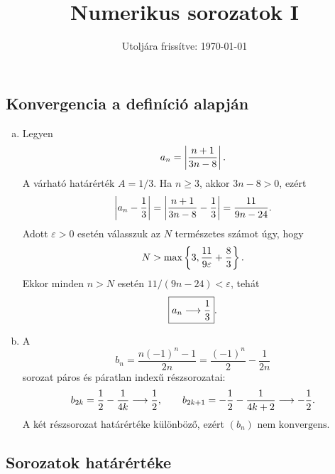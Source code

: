 \documentclass{szb-solution}
\title{Numerikus sorozatok I}
\date{Utoljára frissítve: \today}
\begin{document}
\maketitle

\subsection{Konvergencia a definíció alapján}

\begin{enumerate}[a)]
  \item Legyen
        $$
          a_n=\left|\frac{n+1}{3n-8}\right|
          \text.
        $$
        A várható határérték $A=1/3$. Ha $n\geq3$, akkor $3n-8>0$, ezért
        $$
          \left|a_n-\frac13\right|
          =\left|\frac{n+1}{3n-8}-\frac13\right|
          =\frac{11}{9n-24}
          \text.
        $$
        Adott $\varepsilon>0$ esetén válasszuk az $N$ természetes számot úgy,
        hogy
        $$
          N>\max\left\{3,\frac{11}{9\varepsilon}+\frac83\right\}
          \text.
        $$
        Ekkor minden $n>N$ esetén
        $11/(9n-24)<\varepsilon$, tehát
        $$
          \boxed{a_n\longrightarrow\frac13}
          \text.
        $$

  \item A
        $$
          b_n=\frac{n(-1)^n-1}{2n}
          =\frac{(-1)^n}{2}-\frac{1}{2n}
        $$
        sorozat páros és páratlan indexű részsorozatai:
        $$
          b_{2k}=\frac12-\frac{1}{4k}\longrightarrow\frac12,
          \qquad
          b_{2k+1}=-\frac12-\frac{1}{4k+2}\longrightarrow-\frac12
          \text.
        $$
        A két részsorozat határértéke különböző, ezért
        $\boxed{(b_n)\text{ nem konvergens}}$.
\end{enumerate}

\subsection{Sorozatok határértéke}
\end{document}
